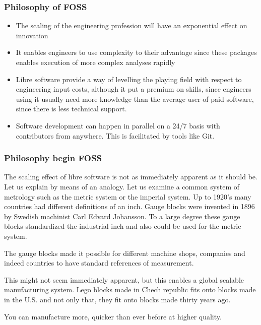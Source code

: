 \documentclass{beamer}
\begin{document}
\begin{frame}
\frametitle{Philosophy of FOSS}

\begin{itemize}
\item The scaling of the engineering profession will have an exponential effect on innovation
\item It enables engineers to use complexity to their advantage since these packages enables execution of more complex analyses rapidly
\item Libre software provide a way of levelling the playing field with respect to engineering input costs, although it put a premium on skills, since engineers using it usually need more knowledge than the average user of paid software, since there is less technical support.
\item Software development can happen in parallel on a 24/7 basis with contributors from anywhere.  This is facilitated by tools like Git.
\end{itemize}

\end{frame}




\begin{frame}
\frametitle{Philosophy begin FOSS}

The scaling effect of libre software is not as immediately apparent as it should be.  Let us explain by means of an analogy.
Let us examine a common system of metrology such as the metric system or the imperial system.
Up to 1920's many countries had different definitions of an inch.
Gauge blocks were invented in 1896 by Swedish machinist Carl Edvard Johansson.
To a large degree these gauge blocks standardized the industrial inch and also could be used for the metric system.

The gauge blocks made it possible for different machine shops, companies and indeed countries to have standard references of measurement.

This might not seem immediately apparent, but this enables a global scalable manufacturing system.  Lego blocks made in Chech republic fits onto blocks made in the U.S. and not only that, they fit onto blocks made thirty years ago.

You can manufacture more, quicker than ever before at higher quality.

\end{frame}
\end{document}
